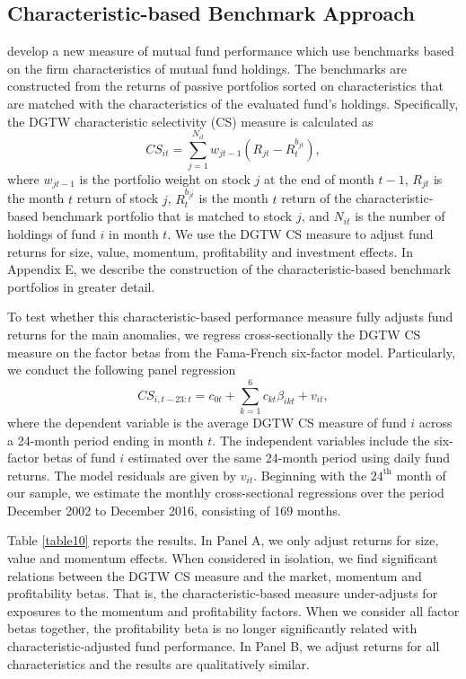 \subsection{Characteristic-based Benchmark Approach}
\label{section5B}
\citet{daniel1997measuring} develop a new measure of mutual fund performance which use benchmarks based on the firm characteristics of mutual fund holdings. The benchmarks are constructed from the returns of passive portfolios sorted on characteristics that are matched with the characteristics of the evaluated fund's holdings. Specifically, the DGTW characteristic selectivity (CS) measure is calculated as 
\begin{equation}
    CS_{it} = \sum_{j=1}^{N_{it}} w_{jt-1} (R_{jt}-R^{b_{jt}}_t),
\end{equation}
where $w_{jt-1}$ is the portfolio weight on stock $j$ at the end of month $t-1$, $R_{jt}$ is the month $t$ return of stock $j$, $R^{b_{jt}}_t$ is the month $t$ return of the characteristic-based benchmark portfolio that is matched to stock $j$, and $N_{it}$ is the number of holdings of fund $i$ in month $t$. We use the DGTW CS measure to adjust fund returns for size, value, momentum, profitability and investment effects. In Appendix E, we describe the construction of the characteristic-based benchmark portfolios in greater detail. 
\par To test whether this characteristic-based performance measure fully adjusts fund returns for the main anomalies, we regress cross-sectionally the DGTW CS measure on the factor betas from the Fama-French six-factor model. Particularly, we conduct the following panel regression
\begin{equation}
    CS_{i,t-23:t} = c_{0t} + \sum^6_{k=1} c_{kt}\beta_{ikt} + v_{it},
\end{equation}
where the dependent variable is the average DGTW CS measure of fund $i$ across a 24-month period ending in month $t$. The independent variables include the six-factor betas of fund $i$ estimated over the same 24-month period using daily fund returns. The model residuals are given by $v_{it}$. Beginning with the $24^{\text{th}}$ month of our sample, we estimate the monthly cross-sectional regressions over the period December 2002 to December 2016, consisting of 169 months.
\par Table \ref{table10} reports the results. In Panel A, we only adjust returns for size, value and momentum effects. When considered in isolation, we find significant relations between the DGTW CS measure and the market, momentum and profitability betas. That is, the characteristic-based measure under-adjusts for exposures to the momentum and profitability factors. When we consider all factor betas together, the profitability beta is no longer significantly related with characteristic-adjusted fund performance. In Panel B, we adjust returns for all characteristics and the results are qualitatively similar. 
